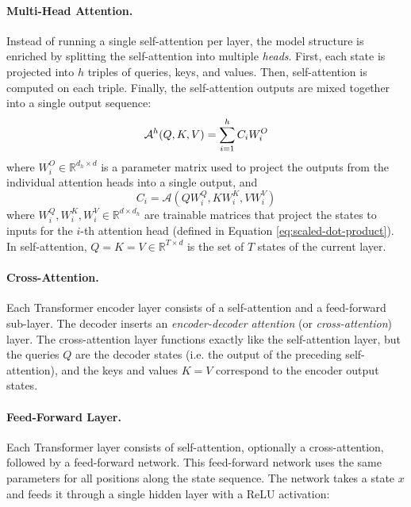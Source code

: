 \paragraph{Multi-Head Attention.} Instead of running a single self-attention
per layer, the model structure is enriched by splitting the self-attention into
multiple \emph{heads}. First, each state is projected into $h$ triples of
queries, keys, and values. Then, self-attention is computed on each triple.
Finally, the self-attention outputs are mixed together into a single output
sequence:
%
\begin{equation}
  \mathcal{A}^h(Q, K, V) = \sum_{i=1}^h C_i W_i^O \\
\end{equation}
%
where $W_i^O \in \mathbb{R}^{d_h \times d}$ is a parameter matrix used to
project the outputs from the individual attention heads into a single output,
and
%
\begin{equation}
  C_i = \mathcal{A}(QW_i^Q, KW_i^K, VW_i^V)
\end{equation}
where $W_i^Q, W_i^K, W_i^V \in \mathbb{R}^{d \times d_h}$ are trainable
matrices that project the states to inputs for the $i$-th attention head
(defined in Equation \ref{eq:scaled-dot-product}). In self-attention,
$Q = K = V \in \mathbb{R}^{T \times d}$ is the set of $T$ states of the current
layer.

\paragraph{Cross-Attention.} Each Transformer encoder layer consists of a
self-attention and a feed-forward sub-layer. The decoder inserts an
\emph{encoder-decoder attention} (or \emph{cross-attention}) layer.  The
cross-attention layer functions exactly like the self-attention layer, but the
queries $Q$ are the decoder states (i.e. the output of the preceding
self-attention), and the keys and values $K = V$ correspond to the encoder
output states.

\paragraph{Feed-Forward Layer.} Each Transformer layer consists
of self-attention, optionally a cross-attention, followed by a feed-forward
network. This feed-forward network uses the same parameters for all positions
along the state sequence. The network takes a state $x$ and feeds it through a
single hidden layer with a ReLU activation:

